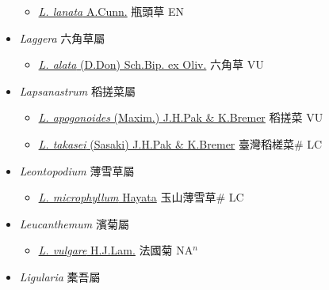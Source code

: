 \begin{itemize}
  \begin{itemize}
        \item[] \href{http://www.theplantlist.org/tpl1.1/search?q=Lagenophora+lanata}{\textit{L. lanata} A.Cunn.}   瓶頭草 EN
  \end{itemize}
 \item[] \textit{Laggera} 六角草屬
                    
  \begin{itemize}
        \item[] \href{http://www.theplantlist.org/tpl1.1/search?q=Laggera+alata}{\textit{L. alata} (D.Don) Sch.Bip. ex Oliv.}   六角草 VU
  \end{itemize}
 \item[] \textit{Lapsanastrum} 稻搓菜屬
                    
  \begin{itemize}
        \item[] \href{http://www.theplantlist.org/tpl1.1/search?q=Lapsanastrum+apogonoides}{\textit{L. apogonoides} (Maxim.) J.H.Pak \& K.Bremer}   稻搓菜 VU
        \item[] \href{http://www.theplantlist.org/tpl1.1/search?q=Lapsanastrum+takasei}{\textit{L. takasei} (Sasaki) J.H.Pak \& K.Bremer}   臺灣稻槎菜\# LC
  \end{itemize}
 \item[] \textit{Leontopodium} 薄雪草屬
                    
  \begin{itemize}
        \item[] \href{http://www.theplantlist.org/tpl1.1/search?q=Leontopodium+microphyllum}{\textit{L. microphyllum} Hayata}   玉山薄雪草\# LC
  \end{itemize}
 \item[] \textit{Leucanthemum} 濱菊屬
                    
  \begin{itemize}
        \item[] \href{http://www.theplantlist.org/tpl1.1/search?q=Leucanthemum+vulgare}{\textit{L. vulgare} H.J.Lam.}   法國菊 NA$^n$
  \end{itemize}
 \item[] \textit{Ligularia} 橐吾屬
                    

\end{itemize}
